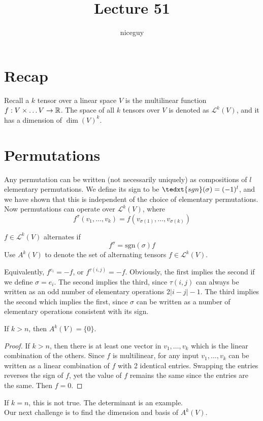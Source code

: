 \documentclass[12pt]{article}
\title{Lecture 51}
\author{niceguy}
\begin{document}
\maketitle

\section{Recap}

Recall a $k$ tensor over a linear space $V$ is the multilinear function $f: V \times \dots V \rightarrow \mathbb{R}$. The space of all $k$ tensors over $V$ is denoted as $\mathcal L^k(V)$, and it has a dimension of $\dim(V)^k$.

\section{Permutations}

Any permutation can be written (not necessarily uniquely) as compositions of $l$ elementary permutations. We define its sign to be $\tedxt{sgn}(\sigma) = (-1)^l$, and we have shown that this is independent of the choice of elementary permutations. Now permutations can operate over $\mathcal L^k(V)$, where
$$f^\sigma(v_1,\dots,v_k) = f(v_{\sigma(1)},\dots,v_{\sigma(k)})$$

\begin{defn}
    $f \in \mathcal L^k(V)$ alternates if
    $$f^\sigma = \text{sgn}(\sigma) f$$
    Use $A^k(V)$ to denote the set of alternating tensors $f \in \mathcal L^k(V)$.
\end{defn}

Equivalently, $f^{e_i} = -f$, or $f^{\tau(i,j)} = -f$. Obviously, the first implies the second if we define $\sigma = e_i$. The second implies the third, since $\tau(i,j)$ can always be written as an odd number of elementary operations $2|i-j| - 1$. The third implies the second which implies the first, since $\sigma$ can be written as a number of elementary operations consistent with its sign.

\begin{lem}
    If $k > n$, then $A^k(V) = \{0\}$.
\end{lem}

\begin{proof}
    If $k > n$, then there is at least one vector in $v_1,\dots,v_k$ which is the linear combination of the others. Since $f$ is multilinear, for any input $v_1,\dots,v_k$ can be written as a linear combination of $f$ with 2 identical entries. Swapping the entries reverses the sign of $f$, yet the value of $f$ remains the same since the entries are the same. Then $f = 0$.
\end{proof}

If $k = n$, this is not true. The determinant is an example. \\

Our next challenge is to find the dimension and basis of $A^k(V)$.
\end{document}
